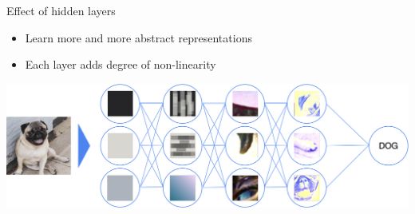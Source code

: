 \documentclass[11pt,compress,t,notes=noshow, xcolor=table]{beamer}
\begin{document}
\begin{vbframe}{Effect of hidden layers}
\begin{itemize}
    \small \item Learn more and more abstract representations
    \small \item Each layer adds degree of non-linearity
\end{itemize}
\vspace{1cm}
\begin{center}
   \includegraphics[width = \textwidth]{figure_man/nutshell-nn-hidden-layers.png}    
\end{center}

\end{vbframe}


\endlecture
\end{document}
